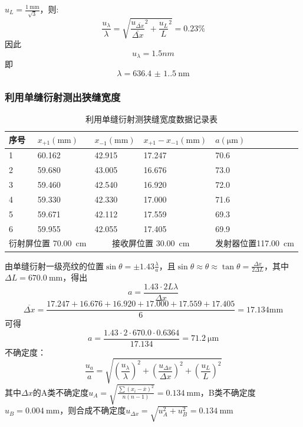 \documentclass[]{../../templates/Report}%
\begin{document}
\begin{fullreportonly}
$u_L = \frac{\SI{1}{\milli \meter}}{\sqrt{3}}$，则:
\[
\frac{u_\lambda}{\lambda} = \sqrt{\frac{u_{\bar{\Delta x}}}{\bar{\Delta x}}^2 + \frac{u_L}{L}^2} = 0.23\%
\]
因此
\[
u_\lambda = 1.5nm
\]
即
\[
\lambda = \SI{636.4(1.5)}{\nano\meter}
\]
\subsubsection{利用单缝衍射测出狭缝宽度}
\begin{table}[H]
\centering
\caption{利用单缝衍射测狭缝宽度数据记录表}
\label{tab:a}
\begin{tabular}{|ll|ll|l|}
\hline
\multicolumn{1}{|l|}{序号} & $x_{+1}(\si{\mm})$ & \multicolumn{1}{l|}{$x_{-1}(\si{\mm})$} & $x_{+1} - x_{-1}(\si{\mm})$ & $a(\si{\micro \meter})$                    \\ \hline
\multicolumn{1}{|l|}{1} & 60.162 & \multicolumn{1}{l|}{42.915} & 17.247 & 70.6 \\ \hline
\multicolumn{1}{|l|}{2} & 59.680 & \multicolumn{1}{l|}{43.005} & 16.676 & 73.0 \\ \hline
\multicolumn{1}{|l|}{3} & 59.460 & \multicolumn{1}{l|}{42.540} & 16.920 & 72.0 \\ \hline
\multicolumn{1}{|l|}{4} & 59.330 & \multicolumn{1}{l|}{42.330} & 17.000 & 71.6 \\ \hline
\multicolumn{1}{|l|}{5} & 59.671 & \multicolumn{1}{l|}{42.112} & 17.559 & 69.3 \\ \hline
\multicolumn{1}{|l|}{6} & 59.955 & \multicolumn{1}{l|}{42.055} & 17.405 & 69.9 \\ \hline
\multicolumn{2}{|c|}{衍射屏位置 \SI{70.00}{\cm}}   & \multicolumn{2}{c|}{接收屏位置 \SI{30.00}{\cm}}                            & \multicolumn{1}{c|}{发射器位置\SI{117.00}{\cm}} \\ \hline
\end{tabular}%
\end{table}
由单缝衍射一级亮纹的位置$\sin \theta = \pm 1.43 \frac{\lambda}{a}$，且$\sin \theta \approx \theta \approx \tan \theta = \frac{\Delta x}{2\Delta L}$，其中$\Delta L = \SI{670.0}{\mm}$，得出
\[
a = \frac{1.43 \cdot 2L\lambda}{\Delta x}
\]
\[
\overline{\Delta x} = \frac{17.247 + 16.676 + 16.920 + 17.000 + 17.559 + 17.405}{6} = 17.134 \si{\mm}
\]
可得
\[a = \frac{1.43 \cdot 2 \cdot 670.0 \cdot 0.6364}{17.134} = \SI{71.2}{\micro \meter}\]
不确定度：
\[
\frac{u_a}{a} = \sqrt{\left(\frac{u_\lambda}{\lambda}\right)^2 + \left(\frac{u_{\Delta x}}{\Delta x}\right)^2 + \left(\frac{u_{L}}{L}\right)^2}
\]
其中$\Delta x$的A类不确定度$u_A = \sqrt{\frac{\sum{(x_i - \bar{x})^2}}{n(n-1)}} = \SI{0.134}{\mm}$，B类不确定度$u_B = \SI{0.004}{\mm}$，则合成不确定度$u_{\Delta x} = \sqrt{u_A^2 + u_B^2} = \SI{0.134}{\mm}$


\end{fullreportonly}
\end{document}
